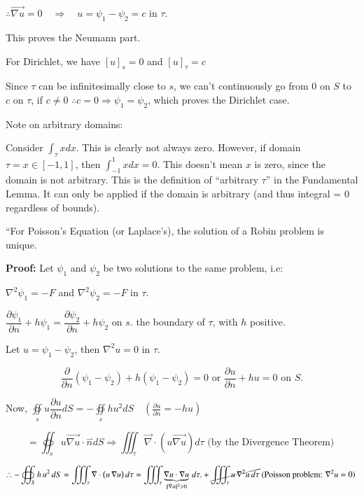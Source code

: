 \documentclass{report}
\begin{document}
$\therefore\overrightarrow{\nabla u}=0\quad\Rightarrow\quad u=\psi_1-\psi_2=c$ in $\tau$.

This proves the Neumann part.

For Dirichlet, we have $[u]_{s}=0$ and $[u]_{\tau}=c$

Since $\tau$ can be infinitesimally close to $s$, we can't continuously go from 0 on $S$ to $c$ on $\tau$, if $c \neq 0$ $\therefore c=0 \Rightarrow \psi_{1}=\psi_{2}$, which proves the Dirichlet case.

Note on arbitrary domains:

Consider $\displaystyle\int_{\tau} x d x$. This is clearly not always zero. However, if domain $\tau=x \in[-1,1]$, then $\displaystyle\int_{-1}^{1} x d x=0$. This doesn't mean $x$ is zero, since the domain is not arbitrary. This is the definition of ``arbitrary $\tau$'' in the Fundamental Lemma. It can only be applied if the domain is arbitrary (and thus integral = 0 regardless of bounds).

``For Poisson's Equation (or Laplace's), the solution of a Robin problem is unique.

\textbf{Proof:} Let $\psi_{1}$ and $\psi_{2}$ be two solutions to the same problem, i.e:

$\nabla^{2} \psi_{1}=-F$ and $\nabla^{2} \psi_{2}=-F$ in $\tau$.

$\dfrac{\partial \psi_{1}}{\partial n}+h \psi_{1}=\dfrac{\partial \psi_{2}}{\partial n}+h \psi_{2}$ on $s$. the boundary of $\tau$, with $h$ positive.

Let $u=\psi_{1}-\psi_{2}$, then $\nabla^{2} u=0$ in $\tau$.

$$
\dfrac{\partial}{\partial n}\left(\psi_{1}-\psi_{2}\right)+h\left(\psi_{1}-\psi_{2}\right)=0 \text { or } \frac{\partial u}{\partial n}+h u=0 \text { on } S .
$$

Now, $\oiint\limits_{s} u \dfrac{\partial u}{\partial n} d S=-\oiint\limits_{s} h u^{2} d S \quad\left(\frac{\partial u}{\partial n}=-h u\right)$

$$
=\oiint_{s} u \overrightarrow{\nabla u} \cdot \stackrel{\rightharpoonup}{n} d S \Rightarrow\iiint_{\tau} \vec{\nabla} \cdot(u \overrightarrow{\nabla u}) d \tau \text { (by the Divergence Theorem) }
$$

$$
\therefore -\oiint_{S} h\,u^{2} \, dS 
= \iiint_{\tau} \nabla \cdot \bigl(u\,\nabla u\bigr)\, d\tau
= \iiint_\tau 
  \underbrace{\nabla u \cdot \nabla u}_{\|\nabla u\|^2 \geqslant 0} 
  \, d\tau.
+ \cancel{\iiint_{\tau} u\,\nabla^{2}u \, d\tau}
\text{ (Poisson problem: } \nabla^{2}u = 0\text{) }
$$
\end{document}

